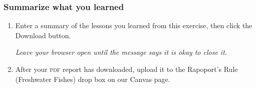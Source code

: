 \documentclass[11pt]{article}
\begin{document}
\subsubsection*{Summarize what you learned}

\begin{enumerate}[resume]
	
	\item Enter a summary of the lessons you learned from this exercise, then click the Download button.
	
	\emph{Leave your browser open until the message says it is okay to close it}.
	
	\item After your \textsc{pdf} report has downloaded,  upload it to the Rapoport's Rule (Freshwater Fishes) drop box on our Canvas page.
\end{enumerate}
\end{document}
